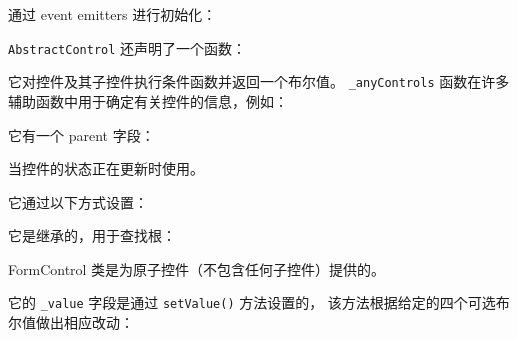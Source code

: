 
通过 event emitters 进行初始化：




\texttt{AbstractControl} 还声明了一个函数：




它对控件及其子控件执行条件函数并返回一个布尔值。
\texttt{\_anyControls} 函数在许多辅助函数中用于确定有关控件的信息，例如：




它有一个 parent 字段：




当控件的状态正在更新时使用。




它通过以下方式设置：




它是继承的，用于查找根：




FormControl 类是为原子控件（不包含任何子控件）提供的。




它的 \texttt{\_value} 字段是通过 \texttt{setValue()} 方法设置的，
该方法根据给定的四个可选布尔值做出相应改动：

